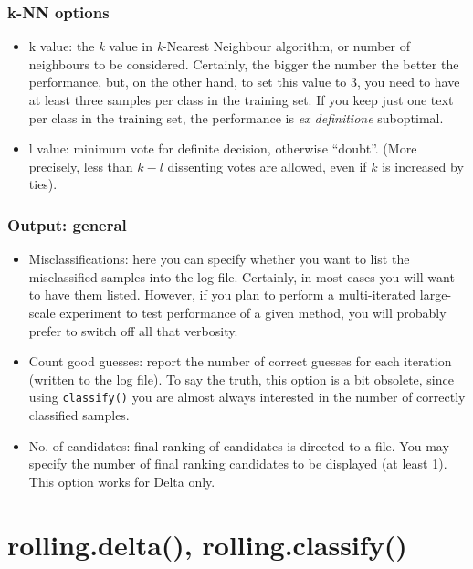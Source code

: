 \documentclass[11pt,a4paper]{article}
\def\margin#1{\marginpar{\textcolor{blue}{\footnotesize\tt #1}}}
\def\code#1{{\tt #1}}
\begin{document}
\subsubsection{k-NN options}
\begin{itemize}
\item k value:\margin{k.value=}\margin{<integer>} the \textit{k} value
in \textit{k}-Nearest Neighbour algorithm, or number of neighbours
to be considered. Certainly, the bigger the number the better the
performance, but, on the other hand, to set this value to 3, you need
to have at least three samples per class in the training set. If you
keep just one text per class in the training set, the performance
is \textit{ex definitione} suboptimal. 
\item l value:\margin{l.value=}\margin{<integer>} minimum vote for
definite decision, otherwise ``doubt''. (More precisely, less than
$k-l$ dissenting votes are allowed, even if $k$ is increased by
ties). 
\end{itemize}

\subsubsection{Output: general}
\begin{itemize}
\item Misclassifications:\margin{final.ranking.of.}\margin{candidates=}\margin{TRUE|FALSE}
here you can specify whether you want to list the misclassified samples
into the log file. Certainly, in most cases you will want to have
them listed. However, if you plan to perform a multi-iterated large-scale
experiment to test performance of a given method, you will probably
prefer to switch off all that verbosity. 
\item Count good guesses:\margin{how.many.correct.}\margin{attributions=}\margin{TRUE|FALSE}
report the number of correct guesses for each iteration (written to
the log file). To say the truth, this option is a bit obsolete, since
using \code{classify()} you are almost always interested in the
number of correctly classified samples. 
\item No. of candidates:\margin{number.of.candidates=}\margin{<integer>}
final ranking of candidates is directed to a file. You may specify
the number of final ranking candidates to be displayed (at least 1).
This option works for Delta only. 
\end{itemize}

\section{rolling.delta(), rolling.classify()}
\end{document}

